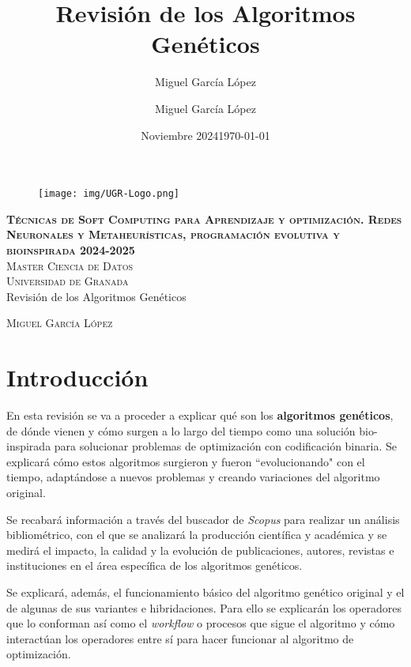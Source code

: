 \documentclass[12pt,letterpaper]{article}
\title{Revisión de los Algoritmos Genéticos}
\author{Miguel García López}
\date{Noviembre 2024}
\author{Miguel García López} %
\date{\normalsize\today} %
\begin{document}
\begin{titlepage}
\begin{figure}
    \vspace{-1.3cm}
    \begin{center}
        \texttt{[image: img/UGR-Logo.png]}
    \end{center}
\end{figure}
\vspace{1.3cm}
\centering
\normalfont \normalsize
\textsc{\textbf{Técnicas de Soft Computing para Aprendizaje y optimización. Redes Neuronales y Metaheurísticas, programación evolutiva y bioinspirada 2024-2025} \\ \vspace{.15cm} Master Ciencia de Datos\\ \vspace{.15cm} Universidad de Granada} \\ [25pt] 
    \huge Revisión de los Algoritmos Genéticos

\normalfont \normalsize \vspace{.30cm}
\textsc{Miguel García López}

\end{titlepage}

\tableofcontents
\listoffigures
\newpage

\section{Introducción}
En esta revisión se va a proceder a explicar qué son los \textbf{algoritmos genéticos}, de dónde vienen y cómo surgen a lo largo del tiempo como una solución bio-inspirada para solucionar problemas de optimización con codificación binaria. Se explicará cómo estos algoritmos surgieron y fueron ``evolucionando" con el tiempo, adaptándose a nuevos problemas y creando variaciones del algoritmo original. 

Se recabará información a través del buscador de \textit{Scopus} para realizar un análisis bibliométrico, con el que se analizará la producción científica y académica y se medirá el impacto, la calidad y la evolución de publicaciones, autores, revistas e instituciones en el área específica de los algoritmos genéticos.

Se explicará, además, el funcionamiento básico del algoritmo genético original y el de algunas de sus variantes e hibridaciones. Para ello se explicarán los operadores que lo conforman así como el \textit{workflow} o procesos que sigue el algoritmo y cómo interactúan los operadores entre sí para hacer funcionar al algoritmo de optimización.
\end{document}
